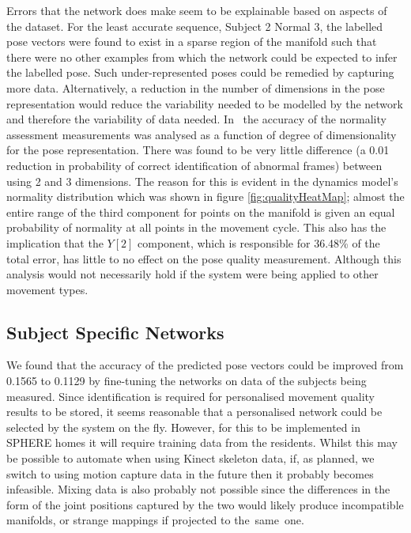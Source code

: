 \documentclass[11pt]{article} %
\begin{document}
Errors that the network does make seem to be explainable based on aspects of the dataset. For the least accurate sequence, Subject 2 Normal 3, the labelled pose vectors were found to exist in a sparse region of the manifold such that there were no other examples from which the network could be expected to infer the labelled pose. Such under-represented poses could be remedied by capturing more data. Alternatively, a reduction in the number of dimensions in the pose representation would reduce the variability needed to be modelled by the network and therefore the variability of data needed. In~\cite{Tao} the accuracy of the normality assessment measurements was analysed as a function of degree of dimensionality for the pose representation. There was found to be very little difference (a 0.01 reduction in probability of correct identification of abnormal frames) between using 2 and 3 dimensions. The reason for this is evident in the dynamics model's normality distribution which was shown in figure \ref{fig:qualityHeatMap}; almost the entire range of the third component for points on the manifold is given an equal probability of normality at all points in the movement cycle. This also has the implication that the $Y[2]$ component, which is responsible for 36.48\% of the total error, has little to no effect on the pose quality measurement. Although this analysis would not necessarily hold if the system were being applied to other movement types.

\subsection{Subject Specific Networks}

We found that the accuracy of the predicted pose vectors could be improved from 0.1565 to 0.1129 by fine-tuning the networks on data of the subjects being measured. Since identification is required for personalised movement quality results to be stored, it seems reasonable that a personalised network could be selected by the system on the fly. However, for this to be implemented in SPHERE homes it will require training data from the residents. Whilst this may be possible to automate when using Kinect skeleton data, if, as planned, we switch to using motion capture data in the future then it probably becomes infeasible. Mixing data is also probably not possible since the differences in the form of the joint positions captured by the two would likely produce incompatible manifolds, or strange mappings if projected to the~same~one.
\end{document}
